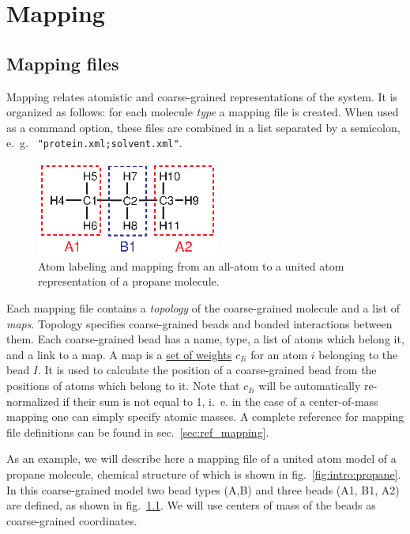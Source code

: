 \chapter{Mapping}
\label{sec:mapping}

\section{Mapping files}

Mapping relates atomistic and coarse-grained representations of the system. It is organized as follows: for each molecule {\em type} a mapping file is created. When used as a command option, these files are combined in a list separated by a semicolon, e.~g. ~\texttt{"protein.xml;solvent.xml"}.

\begin{figure}
  \includegraphics[width=6cm]{usage/fig/propane.eps}
  \caption{Atom labeling and mapping from an all-atom to a united atom representation of a propane molecule.
  \label{fig:propane_map}
}
\end{figure}

Each mapping file contains a {\em topology} of the coarse-grained molecule and a list of {\em maps}. Topology specifies coarse-grained beads and bonded interactions between them. Each coarse-grained bead has a name, type, a list of atoms which belong it, and a link to a map. A map is a \hyperref[sec:mapping_operator]{set of weights} $c_{Ii}$ for an atom $i$ belonging to the bead $I$. It is used to calculate the position of a coarse-grained bead from the positions of atoms which belong to it. Note that $c_{Ii}$ will be automatically re-normalized if their sum is not equal to 1, i.~e. in the case of a center-of-mass mapping one can simply specify atomic masses.
A complete reference for mapping file definitions can be found in sec.~\ref{sec:ref_mapping}.

As an example, we will describe here a mapping file of a united atom model of a propane molecule, chemical structure of which is shown in fig.~\ref{fig:intro:propane}. In this coarse-grained model two bead types (A,B) and three beads (A1, B1, A2) are defined, as shown in fig.~\ref{fig:propane_map}. We will use centers of mass of the beads as  coarse-grained coordinates.

